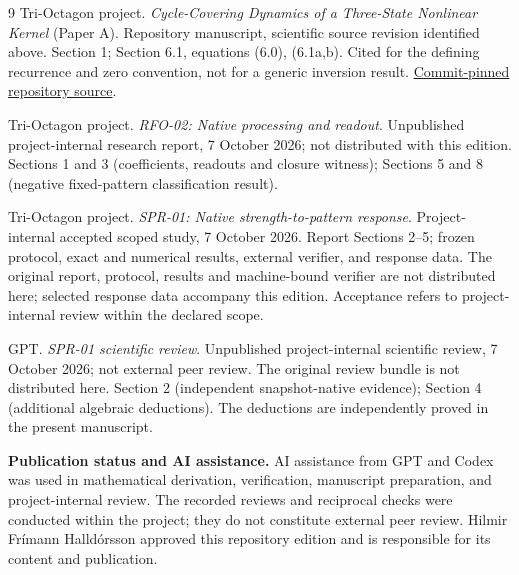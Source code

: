 \documentclass[11pt,a4paper]{article}
\begin{document}
\begin{thebibliography}{9}
Tri-Octagon project. \emph{Cycle-Covering Dynamics of a Three-State Nonlinear Kernel} (Paper A). Repository manuscript, scientific source revision identified above. Section 1; Section 6.1, equations (6.0), (6.1a,b). Cited for the defining recurrence and zero convention, not for a generic inversion result. \href{https://github.com/pzychozen/trioctagon-physics/blob/6794a72e934a5383547c2507d8c4891346cddf7a/papers/PAPER_A/publication/paper_A_publication.md}{Commit-pinned repository source}.

Tri-Octagon project. \emph{RFO-02: Native processing and readout}. Unpublished project-internal research report, 7 October 2026; not distributed with this edition. Sections 1 and 3 (coefficients, readouts and closure witness); Sections 5 and 8 (negative fixed-pattern classification result).

Tri-Octagon project. \emph{SPR-01: Native strength-to-pattern response}. Project-internal accepted scoped study, 7 October 2026. Report Sections 2--5; frozen protocol, exact and numerical results, external verifier, and response data. The original report, protocol, results and machine-bound verifier are not distributed here; selected response data accompany this edition. Acceptance refers to project-internal review within the declared scope.

GPT. \emph{SPR-01 scientific review}. Unpublished project-internal scientific review, 7 October 2026; not external peer review. The original review bundle is not distributed here. Section 2 (independent snapshot-native evidence); Section 4 (additional algebraic deductions). The deductions are independently proved in the present manuscript.
\end{thebibliography}

\vfill
\noindent\textbf{Publication status and AI assistance.} AI assistance from GPT and Codex was used in mathematical derivation, verification, manuscript preparation, and project-internal review. The recorded reviews and reciprocal checks were conducted within the project; they do not constitute external peer review. Hilmir Fr\'imann Halld\'orsson approved this repository edition and is responsible for its content and publication.
\end{document}
